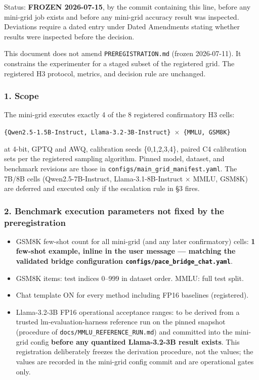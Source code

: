 Status: \textbf{FROZEN 2026-07-15}, by the commit containing this line, before any mini-grid job exists and before any mini-grid accuracy result was inspected. Deviations require a dated entry under Dated Amendments stating whether results were inspected before the decision.

This document does not amend \texttt{PREREGISTRATION.md} (frozen 2026-07-11). It constrains the experimenter for a staged subset of the registered grid. The registered H3 protocol, metrics, and decision rule are unchanged.

\subsubsection{1. Scope}
The mini-grid executes exactly 4 of the 8 registered confirmatory H3 cells:

\texttt{\{Qwen2.5-\allowbreak{}1.5B-\allowbreak{}Instruct, Llama-\allowbreak{}3.2-\allowbreak{}3B-\allowbreak{}Instruct\} $\times$ \{MMLU, GSM8K\}}

at 4-bit, GPTQ and AWQ, calibration seeds \{0,1,2,3,4\}, paired C4 calibration sets per the registered sampling algorithm. Pinned model, dataset, and benchmark revisions are those in \texttt{configs/\allowbreak{}main\_grid\_manifest.yaml}. The 7B/8B cells (Qwen2.5-7B-Instruct, Llama-3.1-8B-Instruct $\times$ MMLU, GSM8K) are deferred and executed only if the escalation rule in \S{}3 fires.

\subsubsection{2. Benchmark execution parameters not fixed by the preregistration}
\begin{itemize}
\item GSM8K few-shot count for all mini-grid (and any later confirmatory) cells: \textbf{1 few-shot example, inline in the user message --- matching the validated bridge configuration \texttt{configs/\allowbreak{}pace\_bridge\_chat.yaml}}.
\item GSM8K items: test indices 0--999 in dataset order. MMLU: full test split.
\item Chat template ON for every method including FP16 baselines (registered).
\item Llama-3.2-3B FP16 operational acceptance ranges: to be derived from a trusted lm-evaluation-harness reference run on the pinned snapshot (procedure of \texttt{docs/\allowbreak{}MMLU\_REFERENCE\_RUN.md}) and committed into the mini-grid config \textbf{before any quantized Llama-3.2-3B result exists}. This registration deliberately freezes the derivation procedure, not the values; the values are recorded in the mini-grid config commit and are operational gates only.
\end{itemize}
